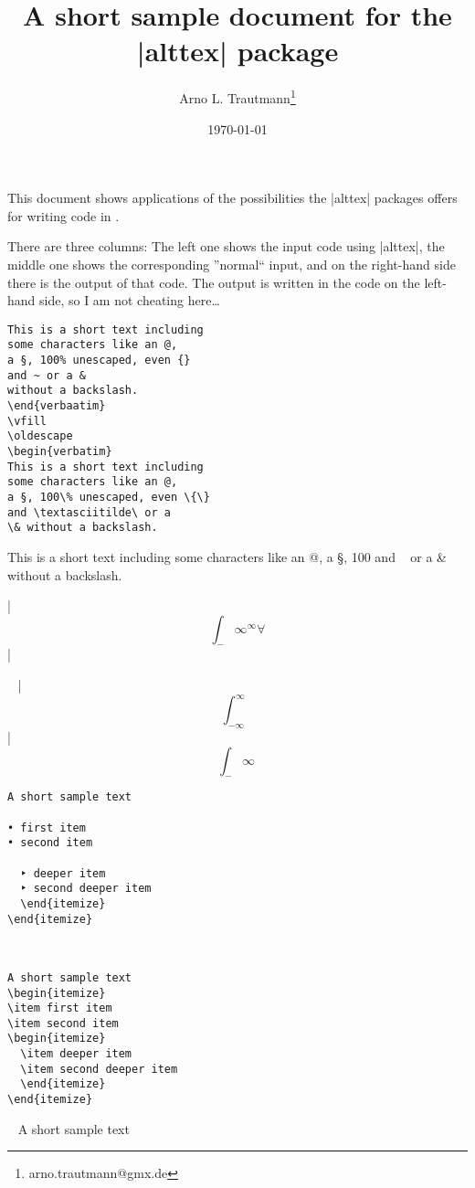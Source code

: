 \documentclass{article}
\title{A short sample document for the |alttex| package}
\author{Arno L. Trautmann\thanks{arno.trautmann@gmx.de}}
\date{\today}
\begin{document}
\maketitle
This document shows applications of the possibilities the |alttex| packages offers for writing code in \XeLaTeX.

There are three columns: The left one shows the input code using |alttex|, the middle one shows the corresponding ”normal“ input, and on the right-hand side there is the output of that code. The output is written in the code on the left-hand side, so I am not cheating here…\vspace{2cm}

\noescape
\begin{verbatim}
This is a short text including
some characters like an @,
a §, 100% unescaped, even {}
and ~ or a &
without a backslash.
\end{verbaatim}
\vfill
\oldescape
\begin{verbatim}
This is a short text including
some characters like an @,
a §, 100\% unescaped, even \{\}
and \textasciitilde\ or a
\& without a backslash.
\end{verbatim}
\vfill
\noescape
This is a short text including
some characters like an @,
a §, 100%
and ~ or a &
without a backslash.
\oldescape
\endsample
\makealtmath

|\[∫_-∞ ^∞ ∀\]|

\ \vfill
|\[\int_{-\infty}^{\infty}\]|
\ \vfill
\[∫_-∞ \ \]%
\endsample

\begin{verbatim}
A short sample text

• first item
• second item

  ‣ deeper item
  ‣ second deeper item
  \end{itemize}
\end{itemize}
\end{verbatim}
\ \vfill
\begin{verbatim}
A short sample text
\begin{itemize}
\item first item
\item second item
\begin{itemize}
  \item deeper item
  \item second deeper item
  \end{itemize}
\end{itemize}
\end{verbatim}
\ \vfill
A short sample text
\def\‣{\end{itemize}}
\end{document}
